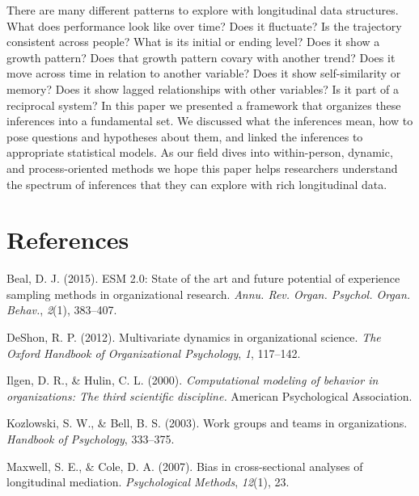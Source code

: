 \documentclass[english,,man]{apa6}
\theoremstyle{definition}
\theoremstyle{definition}
\theoremstyle{definition}
\theoremstyle{remark}
\begin{document}
There are many different patterns to explore with longitudinal data
structures. What does performance look like over time? Does it
fluctuate? Is the trajectory consistent across people? What is its
initial or ending level? Does it show a growth pattern? Does that growth
pattern covary with another trend? Does it move across time in relation
to another variable? Does it show self-similarity or memory? Does it
show lagged relationships with other variables? Is it part of a
reciprocal system? In this paper we presented a framework that organizes
these inferences into a fundamental set. We discussed what the
inferences mean, how to pose questions and hypotheses about them, and
linked the inferences to appropriate statistical models. As our field
dives into within-person, dynamic, and process-oriented methods we hope
this paper helps researchers understand the spectrum of inferences that
they can explore with rich longitudinal data.

\newpage

\hypertarget{references}{%
\section{References}\label{references}}

\setlength{\parindent}{-0.5in}
\setlength{\leftskip}{0.5in}

\hypertarget{refs}{}
\leavevmode\hypertarget{ref-beal_esm_2015}{}%
Beal, D. J. (2015). ESM 2.0: State of the art and future potential of
experience sampling methods in organizational research. \emph{Annu. Rev.
Organ. Psychol. Organ. Behav.}, \emph{2}(1), 383--407.

\leavevmode\hypertarget{ref-deshon_multivariate_2012}{}%
DeShon, R. P. (2012). Multivariate dynamics in organizational science.
\emph{The Oxford Handbook of Organizational Psychology}, \emph{1},
117--142.

\leavevmode\hypertarget{ref-ilgen_computational_2000}{}%
Ilgen, D. R., \& Hulin, C. L. (2000). \emph{Computational modeling of
behavior in organizations: The third scientific discipline.} American
Psychological Association.

\leavevmode\hypertarget{ref-kozlowski_work_2003}{}%
Kozlowski, S. W., \& Bell, B. S. (2003). Work groups and teams in
organizations. \emph{Handbook of Psychology}, 333--375.

\leavevmode\hypertarget{ref-maxwell2007bias}{}%
Maxwell, S. E., \& Cole, D. A. (2007). Bias in cross-sectional analyses
of longitudinal mediation. \emph{Psychological Methods}, \emph{12}(1),
23.
\end{document}
